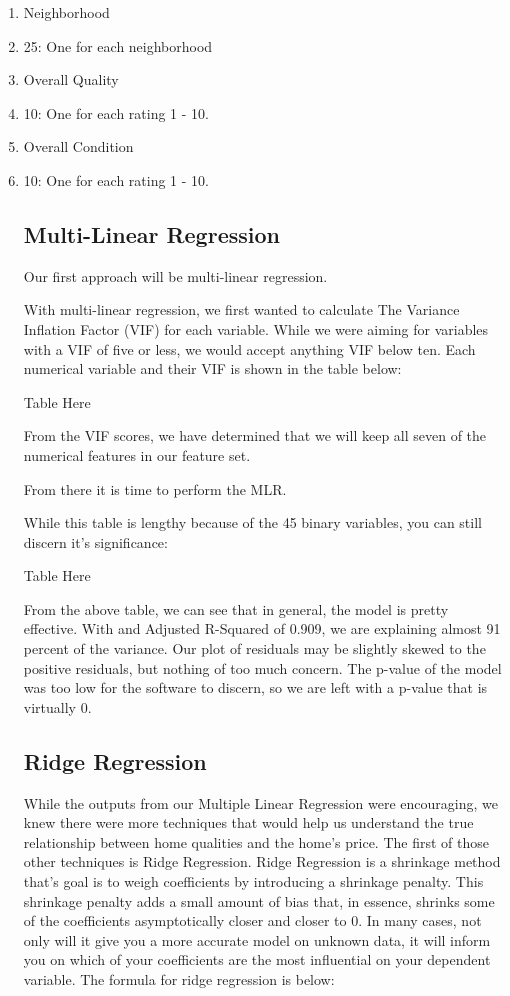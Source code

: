 \documentclass{article}
\begin{document}
	\begin{enumerate}
		\item Neighborhood
		\item[\textbullet] 25: One for each neighborhood
		\item Overall Quality
		\item[\textbullet] 10: One for each rating 1 - 10.
		\item Overall Condition
		\item[\textbullet] 10: One for each rating 1 - 10.

	\subsection{Multi-Linear Regression}

	Our first approach will be multi-linear regression.

	With multi-linear regression, we first wanted to calculate The Variance Inflation Factor (VIF) for each variable. While we were aiming for variables with a VIF of five or less, we would accept anything VIF below ten. Each numerical variable and their VIF is shown in the table below:

	Table Here

	From the VIF scores, we have determined that we will keep all seven of the numerical features in our feature set. 

	From there it is time to perform the MLR.

	While this table is lengthy because of the 45 binary variables, you can still discern it's significance:

	Table Here

	From the above table, we can see that in general, the model is pretty effective. With and Adjusted R-Squared of 0.909, we are explaining almost 91 percent of the variance. Our plot of residuals may be slightly skewed to the positive residuals, but nothing of too much concern. The p-value of the model was too low for the software to discern, so we are left with a p-value that is virtually 0. 

	\subsection{Ridge Regression}

	While the outputs from our Multiple Linear Regression were encouraging, we knew there were more techniques that would help us understand the true relationship between home qualities and the home's price. The first of those other techniques is Ridge Regression.
	Ridge Regression is a shrinkage method that's goal is to weigh coefficients by introducing a shrinkage penalty. This shrinkage penalty adds a small amount of bias that, in essence, shrinks some of the coefficients asymptotically closer and closer to 0. In many cases, not only will it give you a more accurate model on unknown data, it will inform you on which of your coefficients are the most influential on your dependent variable. The formula for ridge regression is below:


\end{enumerate}
\end{document}
